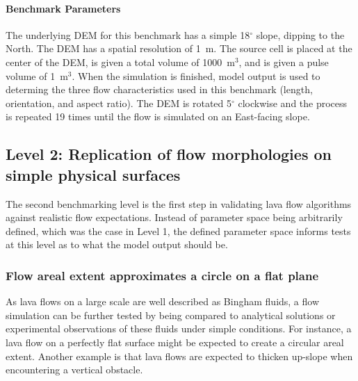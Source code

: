 \documentclass[12pt,letter]{article}
\begin{document}
		\paragraph{Benchmark Parameters} The underlying DEM for this benchmark has a simple 18$^{\circ}$ slope, dipping to the North. The DEM has a spatial resolution of 1~m. The source cell is placed at the center of the DEM, is given a total volume of 1000~m$^3$, and is given a pulse volume of 1~m$^3$. When the simulation is finished, model output is used to determing the three flow characteristics used in this benchmark (length, orientation, and aspect ratio). The DEM is rotated 5$^{\circ}$ clockwise and the process is repeated 19 times until the flow is simulated on an East-facing slope.


	\subsection{Level 2: Replication of flow morphologies on simple physical surfaces}
	
	The second benchmarking level is the first step in validating lava flow algorithms against realistic flow expectations. Instead of parameter space being arbitrarily defined, which was the case in Level 1, the defined parameter space informs tests at this level as to what the model output should be.
	
		\subsubsection{Flow areal extent approximates a circle on a flat plane}\label{test:Bing_circ}
		
			As lava flows on a large scale are well described as Bingham fluids, a flow simulation can be further tested by being compared to analytical solutions or experimental observations of these fluids under simple conditions. For instance, a lava flow on a perfectly flat surface might be expected to create a circular areal extent. Another example is that lava flows are expected to thicken up-slope when encountering a vertical obstacle.
	
\end{document}
